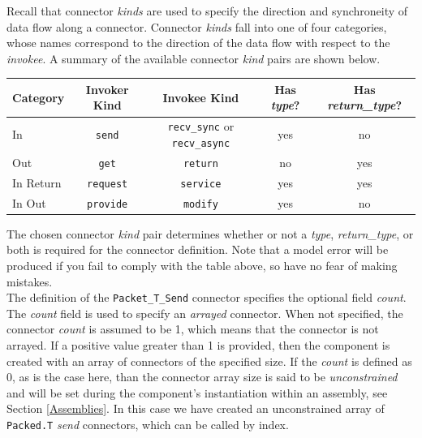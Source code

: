 Recall that connector \textit{kinds} are used to specify the direction and synchroneity of data flow along a connector. Connector \textit{kinds} fall into one of four categories, whose names correspond to the direction of the data flow with respect to the \textit{invokee}. A summary of the available connector \textit{kind} pairs are shown below.

\vspace{5mm} %
\begin{center}
  \begin{tabular}{ | l | c | c | c | c |}
    \hline
    \textbf{Category} & \textbf{Invoker Kind} & \textbf{Invokee Kind} & \textbf{Has \textit{type}?} & \textbf{Has \textit{return\_type}?} \\ \hline
    In & \texttt{send} & \texttt{recv\_sync} or \texttt{recv\_async} & yes & no \\ \hline
    Out & \texttt{get} & \texttt{return} & no & yes \\ \hline
    In Return & \texttt{request} & \texttt{service} & yes & yes \\ \hline
    In Out & \texttt{provide} & \texttt{modify} & yes & no \\ \hline
  \end{tabular}
\end{center}
\vspace{5mm} %

The chosen connector \textit{kind} pair determines whether or not a \textit{type}, \textit{return\_type}, or both is required for the connector definition. Note that a model error will be produced if you fail to comply with the table above, so have no fear of making mistakes. \\

The definition of the \texttt{Packet\_T\_Send} connector specifies the optional field \textit{count}. The \textit{count} field is used to specify an \textit{arrayed} connector. When not specified, the connector \textit{count} is assumed to be 1, which means that the connector is not arrayed. If a positive value greater than 1 is provided, then the component is created with an array of connectors of the specified size. If the \textit{count} is defined as 0, as is the case here, than the connector array size is said to be \textit{unconstrained} and will be set during the component's instantiation within an assembly, see Section \ref{Assemblies}. In this case we have created an unconstrained array of \texttt{Packed.T} \textit{send} connectors, which can be called by index. \\


